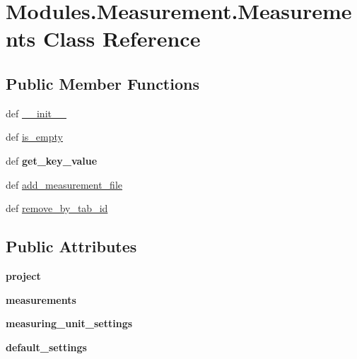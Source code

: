 \hypertarget{classModules_1_1Measurement_1_1Measurements}{\section{Modules.\-Measurement.\-Measurements Class Reference}
\label{classModules_1_1Measurement_1_1Measurements}
}
\subsection*{Public Member Functions}
\begin{DoxyCompactItemize}
\item 
def \hyperlink{classModules_1_1Measurement_1_1Measurements_a7fd84aa1e23987dfab6ff6be8963d46b}{\-\_\-\-\_\-init\-\_\-\-\_\-}
\item 
def \hyperlink{classModules_1_1Measurement_1_1Measurements_abf24668677bfc6643a281dbee60ad6e6}{is\-\_\-empty}
\item 
\hypertarget{classModules_1_1Measurement_1_1Measurements_ae09e067353055563c7874b83cffe6900}{def {\bfseries get\-\_\-key\-\_\-value}}\label{classModules_1_1Measurement_1_1Measurements_ae09e067353055563c7874b83cffe6900}

\item 
def \hyperlink{classModules_1_1Measurement_1_1Measurements_af23574d8f8d6dc2390313022a39a06d0}{add\-\_\-measurement\-\_\-file}
\item 
def \hyperlink{classModules_1_1Measurement_1_1Measurements_a225559ff490f6291a7e82525cd08c836}{remove\-\_\-by\-\_\-tab\-\_\-id}
\end{DoxyCompactItemize}
\subsection*{Public Attributes}
\begin{DoxyCompactItemize}
\item 
\hypertarget{classModules_1_1Measurement_1_1Measurements_a06a95dd7297b64b43b1279e5fbd702f5}{{\bfseries project}}\label{classModules_1_1Measurement_1_1Measurements_a06a95dd7297b64b43b1279e5fbd702f5}

\item 
\hypertarget{classModules_1_1Measurement_1_1Measurements_a9b52a373e9f67d93778fc272b40aec6d}{{\bfseries measurements}}\label{classModules_1_1Measurement_1_1Measurements_a9b52a373e9f67d93778fc272b40aec6d}

\item 
\hypertarget{classModules_1_1Measurement_1_1Measurements_a9475a1a0676e96790473595bb8ba3707}{{\bfseries measuring\-\_\-unit\-\_\-settings}}\label{classModules_1_1Measurement_1_1Measurements_a9475a1a0676e96790473595bb8ba3707}

\item 
\hypertarget{classModules_1_1Measurement_1_1Measurements_a38139fdda46fc9fbc2a7c5ef097aa8bf}{{\bfseries default\-\_\-settings}}\label{classModules_1_1Measurement_1_1Measurements_a38139fdda46fc9fbc2a7c5ef097aa8bf}

\end{DoxyCompactItemize}


